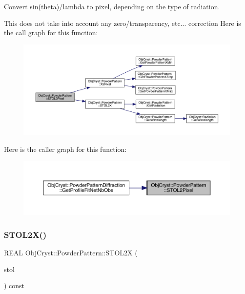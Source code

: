 Convert sin(theta)/lambda to pixel, depending on the type of radiation.

This does not take into account any zero/transparency, etc... correction Here is the call graph for this function\+:
\nopagebreak
\begin{figure}[H]
\begin{center}
\leavevmode
\includegraphics[width=350pt]{class_obj_cryst_1_1_powder_pattern_ab479aca62d7dd2742442229474423a02_cgraph}
\end{center}
\end{figure}
Here is the caller graph for this function\+:
\nopagebreak
\begin{figure}[H]
\begin{center}
\leavevmode
\includegraphics[width=350pt]{class_obj_cryst_1_1_powder_pattern_ab479aca62d7dd2742442229474423a02_icgraph}
\end{center}
\end{figure}
\mbox{\label{class_obj_cryst_1_1_powder_pattern_a05a4b659555b91a3996b016358168ae0}} 
\subsubsection{\texorpdfstring{STOL2X()}{STOL2X()}}
{\footnotesize\ttfamily R\+E\+AL Obj\+Cryst\+::\+Powder\+Pattern\+::\+S\+T\+O\+L2X (\begin{DoxyParamCaption}\item[{const R\+E\+AL}]{stol }\end{DoxyParamCaption}) const}

